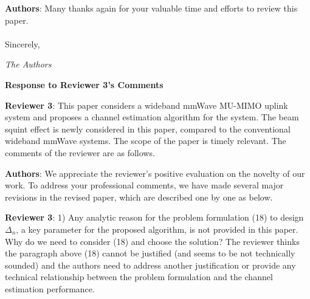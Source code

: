 \documentclass[a4paper,12pt]{article}
\begin{document}
{\color{blue} \textbf{Authors}: Many thanks again for your valuable time and efforts to review this paper.
\\
\\
Sincerely,

 {\it The Authors}}

\clearpage
\begin{center}
 {\Large\bf Response to Reviewer 3's Comments}
\end{center}

\textbf{Reviewer 3}: This paper considers a wideband mmWave MU-MIMO uplink system and proposes a channel estimation algorithm for the system. The beam squint effect is newly considered in this paper, compared to the conventional wideband mmWave systems. The scope of the paper is timely relevant. The comments of the reviewer are as follows.

{\color{blue} \textbf{Authors}: We appreciate the reviewer's positive evaluation on the novelty of our work. To address your professional comments, we have made
several major revisions in the revised paper, which are described one by one as below.
}

\textbf{Reviewer 3}: 1) Any analytic reason for the problem formulation (18) to design ${{\Delta _n}}$, a key parameter for the proposed algorithm, is not provided in this paper. Why do we need to consider (18) and choose the solution? The reviewer thinks the paragraph above (18) cannot be justified (and seems to be not technically sounded) and the authors need to address another justification or provide any technical relationship between the problem formulation and the channel estimation performance.
\end{document}

